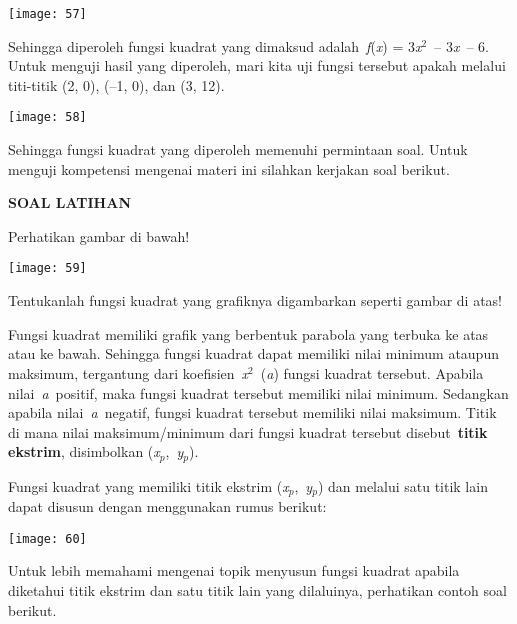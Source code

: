 \documentclass[11pt,fleqn]{book} %
\begin{document}
\begin{myEnumerate}
\begin{itemize}
\begin{center}
\noindent \texttt{[image: 57]}
\end{center}

\noindent Sehingga diperoleh fungsi kuadrat yang dimaksud adalah~\textit{f}(\textit{x}) = 3\textit{x}${}^{2}$~-- 3\textit{x}~-- 6. Untuk menguji hasil yang diperoleh, mari kita uji fungsi tersebut apakah melalui titi-titik (2, 0), (--1, 0), dan (3, 12).

\begin{center}
\noindent \texttt{[image: 58]}
\end{center}

\noindent Sehingga fungsi kuadrat yang diperoleh memenuhi permintaan soal. Untuk menguji kompetensi mengenai materi ini silahkan kerjakan soal berikut.

\noindent \textbf{SOAL LATIHAN}

\noindent Perhatikan gambar di bawah!

\begin{center}
\noindent \texttt{[image: 59]}
\end{center}

\noindent Tentukanlah fungsi kuadrat yang grafiknya digambarkan seperti gambar di atas!

Fungsi kuadrat memiliki grafik yang berbentuk parabola yang terbuka ke atas atau ke bawah. Sehingga fungsi kuadrat dapat memiliki nilai minimum ataupun maksimum, tergantung dari koefisien~\textit{x}${}^{2}$~(\textit{a}) fungsi kuadrat tersebut. Apabila nilai~\textit{a}~positif, maka fungsi kuadrat tersebut memiliki nilai minimum. Sedangkan apabila nilai~\textit{a}~negatif, fungsi kuadrat tersebut memiliki nilai maksimum. Titik di mana nilai maksimum/minimum dari fungsi kuadrat tersebut disebut~\textbf{titik ekstrim}, disimbolkan (\textit{x}${}_{p}$,~\textit{y}${}_{p}$).

\noindent Fungsi kuadrat yang memiliki titik ekstrim (\textit{x}${}_{p}$,~\textit{y}${}_{p}$) dan melalui satu titik lain dapat disusun dengan menggunakan rumus berikut:

\begin{center}
\noindent \texttt{[image: 60]}
\end{center}

\noindent Untuk lebih memahami mengenai topik menyusun fungsi kuadrat apabila diketahui titik ekstrim dan satu titik lain yang dilaluinya, perhatikan contoh soal berikut.


\end{itemize}
\end{myEnumerate}
\end{document}
